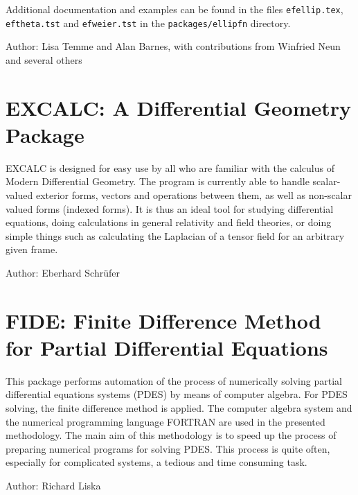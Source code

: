 Additional documentation and examples can
be found in the files \texttt{efellip.tex}, \texttt{eftheta.tst} and
\texttt{efweier.tst} in the \texttt{packages/ellipfn} directory.

Author: Lisa Temme and Alan Barnes, with contributions from Winfried Neun
and several others



\newpage

\section{EXCALC: A Differential Geometry Package}
\label{package:EXCALC}

EXCALC is designed for easy use by all who are familiar with the calculus
of Modern Differential Geometry. The program is currently able to handle
scalar-valued exterior forms, vectors and operations between them, as well
as non-scalar valued forms (indexed forms). It is thus an ideal tool for
studying differential equations, doing calculations in general relativity
and field theories, or doing simple things such as calculating the
Laplacian of a tensor field for an arbitrary given frame.

Author: Eberhard Schr\"ufer



\newpage

\section{FIDE: Finite Difference Method for Partial Differential Equations}

This package performs  automation of  the process of numerically
solving  partial  differential  equations  systems  (PDES)  by  means of
computer algebra.  For PDES solving, the finite difference method is applied.
The  computer  algebra  system  \REDUCE  and  the  numerical  programming
language FORTRAN  are used in the presented methodology. The main aim of
this methodology is to speed up the process of preparing numerical
programs for  solving PDES.  This process is quite often, especially for
complicated systems, a tedious and time consuming task.


Author: Richard Liska



\newpage

